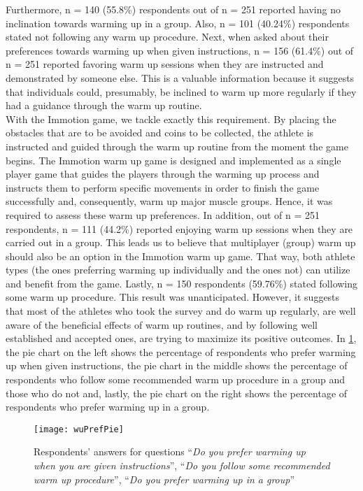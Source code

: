 Furthermore, n = 140 (55.8\%) respondents out of n = 251 reported having no inclination towards warming up in a group. Also, n = 101 (40.24\%) respondents stated not following any warm up procedure. Next, when asked about their preferences towards warming up when given instructions, n = 156 (61.4\%) out of n = 251 reported favoring warm up sessions when they are instructed and demonstrated by someone else. This is a valuable information because it suggests that individuals could, presumably, be inclined to warm up more regularly if they had a guidance through the warm up routine. \\With the Immotion game, we tackle exactly this requirement. By placing the obstacles that are to be avoided and coins to be collected, the athlete is instructed and guided through the warm up routine from the moment the game begins. The Immotion warm up game is designed and implemented as a single player game that guides the players through the warming up process and instructs them to perform specific movements in order to finish the game successfully and, consequently, warm up major muscle groups. Hence, it was required to assess these warm up preferences. In addition, out of n = 251 respondents, n = 111 (44.2\%) reported enjoying warm up sessions when they are carried out in a group. This leads us to believe that multiplayer (group) warm up should also be an option in the Immotion warm up game. That way, both athlete types (the ones preferring warming up individually and the ones not) can utilize and benefit from the game. Lastly, n = 150 respondents (59.76\%) stated following some warm up procedure. This result was unanticipated. However, it suggests that most of the athletes who took the survey and do warm up regularly, are well aware of the beneficial effects of warm up routines, and by following well established and accepted ones, are trying to maximize its positive outcomes. In \ref{fig:wuPrefPie}, the pie chart on the left shows the percentage of respondents who prefer warming up when given instructions, the pie chart in the middle shows the percentage of respondents who follow some recommended warm up procedure in a group and those who do not and, lastly, the pie chart on the right shows the percentage of respondents who prefer warming up in a group.\\
\begin{figure}[h]
    \centering
    \texttt{[image: wuPrefPie]}
    \caption[Results for warm up related questions.]{Respondents' answers for questions ``\textit{Do you prefer warming up when you are given instructions}'', ``\textit{Do you follow some recommended warm up procedure}'', ``\textit{Do you prefer warming up in a group}''}
    \label{fig:wuPrefPie}
\end{figure}\\
